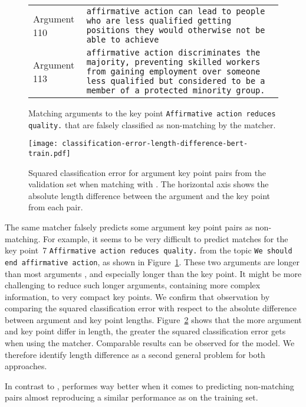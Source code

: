 \begin{figure}
    \begin{tabularx}{\linewidth}{@{}p{4em}X@{}}
        Argument 110 & \texttt{affirmative action can lead to people who are less qualified getting positions they would otherwise not be able to achieve} \\
        Argument 113 & \texttt{affirmative action discriminates the majority, preventing skilled workers from gaining employment over someone less qualified but considered to be a member of a protected minority group.}
    \end{tabularx}
    \caption{Matching arguments to the key point \texttt{Affirmative action reduces quality.} that are falsely classified as non-matching by the \BertBase matcher.}
    \label{example-5-110-113}
\end{figure}
\begin{figure}
    \texttt{[image: classification-error-length-difference-bert-train.pdf]}
    \caption{Squared classification error for argument key point pairs from the validation set when matching with \BertBase. The horizontal axis shows the absolute length difference between the argument and the key point from each pair.}
    \label{classification-error-length}
\end{figure}
The same \BertBase matcher falsely predicts some argument key point pairs as non-matching.
For example, it seems to be very difficult to predict matches for the key point~7 \texttt{Affirmative action reduces quality.} from the topic \texttt{We should end affirmative action}, as shown in Figure~\ref{example-5-110-113}. These two arguments are longer than most arguments ,
and especially longer than the key point.
It might be more challenging to reduce such longer arguments, containing more complex information, to very compact key points.
We confirm that observation by comparing the squared classification error with respect to the absolute difference between argument and key point lengths.
Figure~\ref{classification-error-length} shows that the more argument and key point differ in length, the greater the squared classification error gets when using the \BertBase matcher.
Comparable results can be observed for the \Roberta model.
We therefore identify length difference as a second general problem for both approaches.

In contrast to \Bert, \Roberta performes way better when it comes to predicting non-matching pairs
almost reproducing a similar performance as on the training set.

